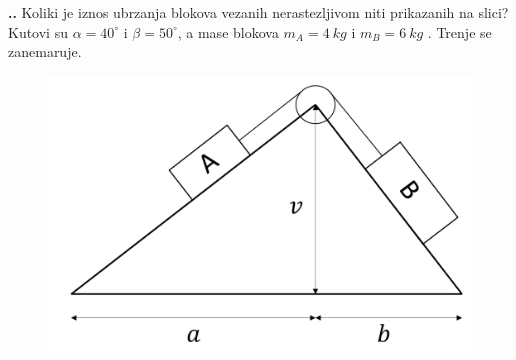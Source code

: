 
\noindent 
\textbf{
\thecjelina.\thezadatak.}
Koliki je iznos ubrzanja blokova vezanih nerastezljivom niti prikazanih na slici? Kutovi su 
$\alpha=40 ^\circ$  i $\beta=50^\circ $, a mase blokova $m_A=4\ kg$ i $m_B=6\ kg$ . Trenje se zanemaruje.

\begin{figure}[ht]%
  \begin{center}
    \includegraphics[scale=0.20]{03_Dinamika_materijalne_tocke/kosina_5_3.png}
  \end{center}
\end{figure}

